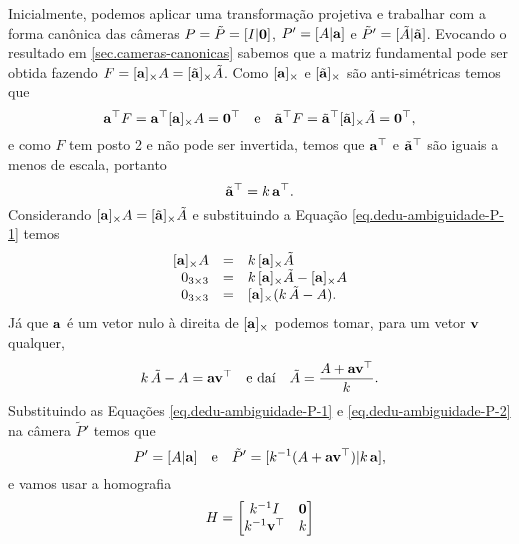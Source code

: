 Inicialmente, podemos aplicar uma transformação projetiva e trabalhar com a forma canônica das câmeras $P=\tilde{P}=[I|{\bf 0}]$, $P'=[A|{\bf a}]$ e $\tilde{P}'=[\tilde{A}|\tilde{{\bf a}}]$. Evocando o resultado em \ref{sec.cameras-canonicas} sabemos que a matriz fundamental pode ser obtida fazendo 
$F=[{\bf a}]_{\times} A=[\tilde{{\bf a}}]_{\times} \tilde{A}$. Como $[{\bf a}]_{\times}$ e $[\tilde{{\bf a}}]_{\times}$ são anti-simétricas temos que
\begin{equation*}
{\bf a}^\top F={\bf a}^\top [{\bf a}]_{\times} A={\bf 0}^\top\quad\text{e}\quad\tilde{{\bf a}}^\top F=\tilde{{\bf a}}^\top [\tilde{{\bf a}}]_{\times} \tilde{A}={\bf 0}^\top,
\end{equation*}
e como $F$ tem posto 2 e não pode ser invertida, temos que ${\bf a}^\top$ e ${\tilde{{\bf a}}^\top}$ são iguais a menos de escala, portanto
\begin{equation}\label{eq.dedu-ambiguidade-P-1}
{\tilde{{\bf a}}^\top}=k\,{\bf a}^\top.
\end{equation}
Considerando $[{\bf a}]_{\times} A=[\tilde{{\bf a}}]_{\times} \tilde{A}$ e substituindo a Equaç\~ao \ref{eq.dedu-ambiguidade-P-1} temos
\begin{equation*}
\begin{array}{rcl}
[{\bf a}]_{\times} A&=&k\,[{\bf a}]_{\times} \tilde{A}\\
0_{3\times3}&=&k\,[{\bf a}]_{\times} \tilde{A}-[{\bf a}]_{\times} A\\
0_{3\times3}&=&[{\bf a}]_{\times}(k\,\tilde{A}-A).
\end{array}
\end{equation*}
Já que ${\bf a}$ é um vetor nulo à direita de $[{\bf a}]_{\times}$ podemos tomar, para um vetor ${\bf v}$ qualquer,
\begin{equation}\label{eq.dedu-ambiguidade-P-2}
k\,\tilde{A}-A={\bf a}{\bf v}^\top\quad\text{e daí}\quad \tilde{A}=\frac{A+{\bf a}{\bf v}^\top}{k}. 
\end{equation}
Substituindo as Equações \ref{eq.dedu-ambiguidade-P-1} e \ref{eq.dedu-ambiguidade-P-2} na câmera $\tilde{P}'$ temos que 
\begin{equation}\label{eq.camera-geral}
P'=[A|{\bf a}]\quad\text{e}\quad \tilde{P}'=[k^{-1}(A+{\bf a}{\bf v}^\top)|k\,{\bf a}],
\end{equation}
e vamos usar a homografia
\begin{equation*}
H=
\begin{bmatrix}
k^{-1}I&{\bf 0}\\
k^{-1}{\bf v}^\top&k
\end{bmatrix}
\end{equation*}
